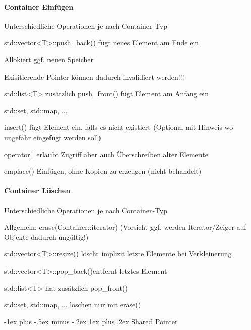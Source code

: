 \documentclass[10pt]{article}
\makeatletter
\renewcommand{\subsubsection}{\@startsection{subsubsection}{3}{0mm}%
                                {-1ex plus -.5ex minus -.2ex}%
                                {1ex plus .2ex}%
                                {\normalfont\small\bfseries}}
\makeatother
\begin{document}
\begin{itemize*}
\paragraph{Container Einfügen}
\begin{itemize*}
  \item Unterschiedliche Operationen je nach Container-Typ
  \item std::vector<T>::push\_back() fügt neues Element am Ende ein
  \begin{itemize*}
    \item Allokiert ggf. neuen Speicher
    \item Exisitierende Pointer können dadurch invalidiert werden!!!
  \end{itemize*}
  \item std::list<T> zusätzlich push\_front() fügt Element am Anfang ein
  \item std::set, std::map, ...
  \begin{itemize*}
    \item insert() fügt Element ein, falls es nicht existiert (Optional mit Hinweis wo ungefähr eingefügt werden soll)
    \item operator[] erlaubt Zugriff aber auch Überschreiben alter Elemente
    \item emplace() Einfügen, ohne Kopien zu erzeugen (nicht behandelt)
  \end{itemize*}
\end{itemize*}

\paragraph{Container Löschen}
\begin{itemize*}
  \item Unterschiedliche Operationen je nach Container-Typ
  \item Allgemein: erase(Container::iterator) (Vorsicht ggf. werden Iterator/Zeiger auf Objekte dadurch ungültig!)
  \item std::vector<T>::resize() löscht implizit letzte Elemente bei Verkleinerung
  \item std::vector<T>::pop\_back()entfernt letztes Element
  \item std::list<T> hat zusätzlich pop\_front()
  \item std::set, std::map, ... löschen nur mit erase()
\end{itemize*}

\subsubsection{Shared Pointer}


\end{itemize*}
\end{document}
